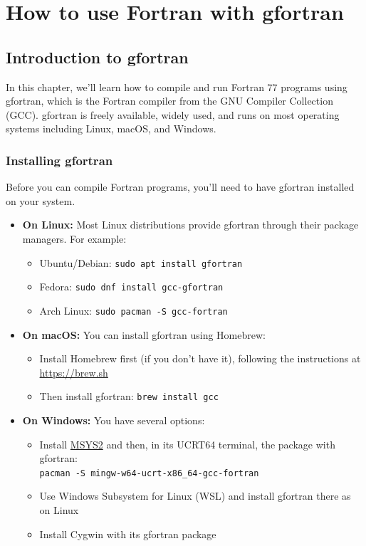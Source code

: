 \chapter{How to use Fortran with gfortran}

\section{Introduction to gfortran}

In this chapter, we'll learn how to compile and run Fortran 77 programs using gfortran, which is the Fortran compiler from the GNU Compiler Collection (GCC). gfortran is freely available, widely used, and runs on most operating systems including Linux, macOS, and Windows.

\subsection{Installing gfortran}

Before you can compile Fortran programs, you'll need to have gfortran installed on your system.

\begin{itemize}
    \item \textbf{On Linux:} Most Linux distributions provide gfortran through their package managers. For example:
    \begin{itemize}
        \item Ubuntu/Debian: \texttt{sudo apt install gfortran}
        \item Fedora: \texttt{sudo dnf install gcc-gfortran}
        \item Arch Linux: \texttt{sudo pacman -S gcc-fortran}
    \end{itemize}
    
    \item \textbf{On macOS:} You can install gfortran using Homebrew:
    \begin{itemize}
        \item Install Homebrew first (if you don't have it), following the instructions at \url{https://brew.sh}
        \item Then install gfortran: \texttt{brew install gcc}
    \end{itemize}
    
    \item \textbf{On Windows:} You have several options:
    \begin{itemize}
        \item Install \href{https://www.msys2.org}{MSYS2} and then, in its UCRT64 terminal, the package with gfortran:\\ \texttt{pacman -S mingw-w64-ucrt-x86\_64-}\allowbreak\texttt{gcc-fortran}
        \item Use Windows Subsystem for Linux (WSL) and install gfortran there as on Linux
        \item Install Cygwin with its gfortran package
    \end{itemize}
\end{itemize}

